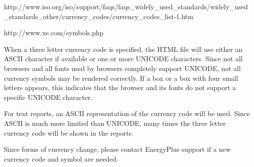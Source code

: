 http://www.iso.org/iso/support/faqs/faqs\_widely\_used\_standards/widely\_used\_standards\_other/currency\_codes/currency\_codes\_list-1.htm

http://www.xe.com/symbols.php

When a three letter currency code is specified, the HTML file will use either an ASCII character if available or one or more UNICODE characters. Since not all browsers and all fonts used by browsers completely support UNICODE, not all currency symbols may be rendered correctly. If a box or a box with four small letters appears, this indicates that the browser and its fonts do not support a specific UNICODE character.

For text reports, an ASCII representation of the currency code will be used. Since ASCII is much more limited than UNICODE, many times the three letter currency code will be shown in the reports.

Since forms of currency change, please contact EnergyPlus support if a new currency code and symbol are needed.
